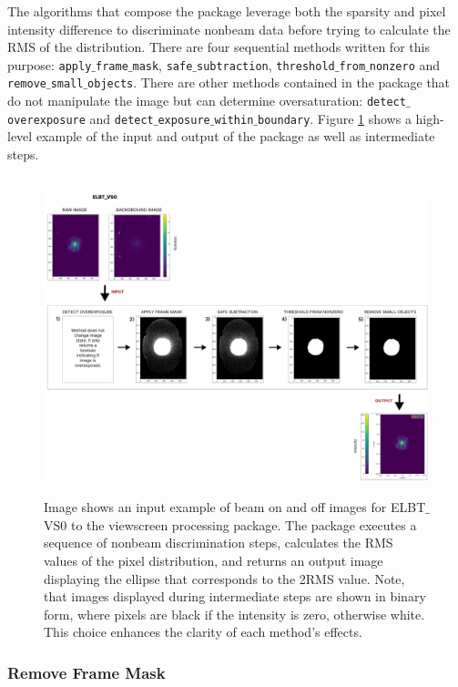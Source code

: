 \documentclass{article}
\begin{document}
The algorithms that compose the package leverage both the sparsity and pixel intensity difference to discriminate nonbeam data before trying to calculate the RMS of the distribution. There are four sequential methods written for this purpose: \texttt{apply$\_$frame$\_$mask}, \texttt{safe$\_$subtraction}, \texttt{threshold$\_$from$\_$nonzero} and \texttt{remove$\_$small$\_$objects}. There are other methods contained in the package that do not manipulate the image but can determine oversaturation:  \texttt{detect$\_$overexposure} and \texttt{detect$\_$exposure$\_$within$\_$boundary}. Figure \ref{fig:8} shows a high-level example of the input and output of the package as well as intermediate steps.
    
\begin{figure}[!h]  
    \centerline{\ \includegraphics[width=\linewidth]{images/processing_pipeline.png}}
    \caption{ Image shows an input example of beam on and off images for ELBT$\_$VS0 to the viewscreen processing package. The package executes a sequence of nonbeam discrimination steps, calculates the RMS values of the pixel distribution, and returns an output image displaying the ellipse that corresponds to the 2RMS value. Note, that images displayed during intermediate steps are shown in binary form, where pixels are black if the intensity is zero, otherwise white. This choice enhances the clarity of each method's effects.}
    \label{fig:8}
\end{figure} 
\newpage
    
\subsubsection{Remove Frame Mask}
\end{document}
